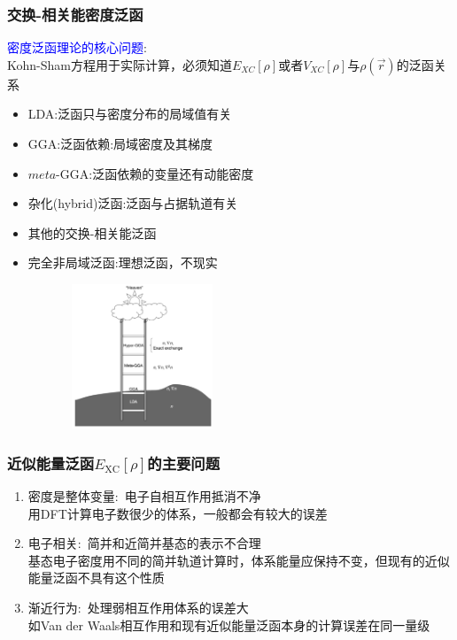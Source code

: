 \frame                               %
{
\frametitle{交换-相关能密度泛函}
\textcolor{blue}{密度泛函理论的核心问题}:\\
\textrm{Kohn-Sham}方程用于实际计算，必须知道$E_{XC}[\rho]$或者$V_{XC}[\rho]$与$\rho(\vec r)$的泛函关系
\vskip 15pt
\begin{minipage}[b]{0.59\textwidth}
 \hspace*{-15pt}
 {\fontsize{7.5pt}{6.0pt}\selectfont\begin{itemize}%
	 \setlength{\itemsep}{10pt}
 \item \textrm{LDA}:泛函只与密度分布的局域值有关
 \item \textrm{GGA}:泛函依赖:局域密度及其梯度
 \item $meta$-\textrm{GGA}:泛函依赖的变量还有动能密度
 \item 杂化(\textrm{hybrid})泛函:泛函与占据轨道有关
 \item 其他的交换-相关能泛函
 \item<1-> 完全非局域泛函:理想泛函，不现实
 \end{itemize}}
\end{minipage}
\hfill
\begin{minipage}[b]{0.39\textwidth}
\hspace*{-10pt}
\includegraphics[height=1.7in,width=3.18in,viewport=10 5 1380 700,clip]{Figures/Jacobi-ladder.png}\\
\end{minipage}
}

\frame                               %
{
	\frametitle{近似能量泛函$E_{\mathrm{XC}}[\rho]$的主要问题}
\vskip 20pt
\begin{enumerate}%
   \setlength{\itemsep}{10pt}
 \item  密度是整体变量:~电子自相互作用抵消不净\\%
	 用\textrm{DFT}计算电子数很少的体系，一般都会有较大的误差
 \item  电子相关:~简并和近简并基态的表示不合理\\
	 基态电子密度用不同的简并轨道计算时，体系能量应保持不变，但现有的近似能量泛函不具有这个性质
 \item  渐近行为:~处理弱相互作用体系的误差大\\
	 如\textrm{Van der Waals}相互作用和现有近似能量泛函本身的计算误差在同一量级
 \end{enumerate}
}

